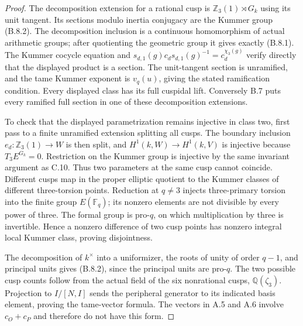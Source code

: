 \begin{proof}
The decomposition extension for a rational cusp is
$\mathbb Z_3(1)\rtimes G_k$ using its unit tangent.
Its sections modulo inertia conjugacy are the Kummer group
(B.8.2).  The decomposition inclusion is a continuous
homomorphism of actual arithmetic groups; after quotienting
the geometric group it gives exactly (B.8.1).
The Kummer cocycle equation and
$s_{d,1}(g)c_ds_{d,1}(g)^{-1}=c_d^{\chi_3(g)}$
verify directly that the displayed product is a section.
The unit-tangent section is unramified, and the tame
Kummer exponent is $v_q(u)$, giving the stated ramification
condition.  Every displayed class has its full cuspidal
lift.  Conversely B.7 puts every ramified full section in
one of these decomposition extensions.

To check that the displayed parametrization remains
injective in class two, first pass to a finite unramified
extension splitting all cusps.  The boundary inclusion
$e_d:\mathbb Z_3(1)\to W$ is then split, and
$H^1(k,W)\to H^1(k,V)$ is injective because
$T_3E^{G_k}=0$.  Restriction on the Kummer group is
injective by the same invariant argument as C.10.
Thus two parameters at the same cusp cannot coincide.
Different cusps map in the proper elliptic quotient to
the Kummer classes of different three-torsion points.
Reduction at $q\ne3$ injects three-primary torsion into
the finite group $E(\mathbb F_q)$; its nonzero elements
are not divisible by every power of three.  The formal
group is pro-$q$, on which multiplication by three is
invertible.  Hence a nonzero difference of two cusp
points has nonzero integral local Kummer class, proving
disjointness.

The decomposition of $k^\times$ into a uniformizer,
the roots of unity of order $q-1$, and principal units
gives (B.8.2), since the principal units are pro-$q$.
The two possible cusp counts follow from the actual
field of the six nonrational cusps, $\mathbb Q(\zeta_3)$.
Projection to $I/[N,I]$ sends the peripheral generator
to its indicated basis element, proving the tame-vector
formula.  The vectors in A.5 and A.6 involve
$c_O+c_P$ and therefore do not have this form.
\end{proof}

